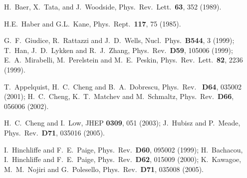 \documentclass[12pt,prd,aps,floats,preprintnumbers,preprint,superscriptaddress,floatfix,nofootinbib]{revtex4}
\begin{document}
\begin{thebibliography}{99}
H.~Baer, X.~Tata, and J.~Woodside, Phys.~Rev.~Lett.~{\bf 63}, 352 (1989).

 H.E.~Haber and G.L.~Kane, Phys.~Rept.~{\bf 117}, 75 (1985).

  G.~F.~Giudice, R.~Rattazzi and J.~D.~Wells,
  Nucl.\ Phys.\  {\bf B544}, 3 (1999); 
  T.~Han, J.~D.~Lykken and R.~J.~Zhang,
  Phys.\ Rev.~{\bf D59}, 105006 (1999); 
 E.~A.~Mirabelli, M.~Perelstein and M.~E.~Peskin,
  Phys.\ Rev.\ Lett.\  {\bf 82}, 2236 (1999).

  T.~Appelquist, H.~C.~Cheng and B.~A.~Dobrescu,
  Phys.\ Rev.~ {\bf D64}, 035002 (2001);
  H.~C.~Cheng, K.~T.~Matchev and M.~Schmaltz,
  Phys.\ Rev.\ {\bf D66}, 056006 (2002).
 
  H.~C.~Cheng and I.~Low,
  JHEP {\bf 0309}, 051 (2003); 
  J.~Hubisz and P.~Meade,
  Phys.\ Rev.\  {\bf D71}, 035016 (2005).  

I.~Hinchliffe and F.~E.~Paige,
  Phys.\ Rev.\  {\bf D60}, 095002 (1999);
H.~Bachacou, I.~Hinchliffe and F.~E.~Paige,
  Phys.\ Rev.\  {\bf D62}, 015009 (2000); 
 K.~Kawagoe, M.~M.~Nojiri and G.~Polesello,
  Phys.\ Rev.\  {\bf D71}, 035008 (2005). 
 
\end{thebibliography}
\end{document}
